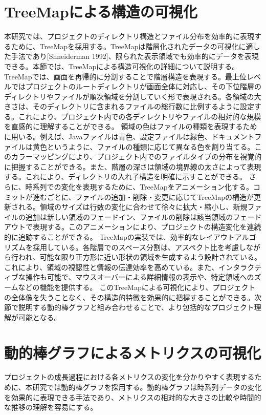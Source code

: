 \documentclass[12pt,twoside]{jbook}
\begin{document}
\section{TreeMapによる構造の可視化}
本研究では、プロジェクトのディレクトリ構造とファイル分布を効率的に表現するために、TreeMapを採用する。TreeMapは階層化されたデータの可視化に適した手法であり[Shneiderman 1992]、限られた表示領域でも効率的にデータを表現できる。本節では、TreeMapによる構造可視化の詳細について説明する。
TreeMapでは、画面を再帰的に分割することで階層構造を表現する。最上位レベルではプロジェクトのルートディレクトリが画面全体に対応し、その下位階層のディレクトリやファイルが順次領域を分割していく形で表現される。各領域の大きさは、そのディレクトリに含まれるファイルの総行数に比例するように設定する。これにより、プロジェクト内での各ディレクトリやファイルの相対的な規模を直感的に理解することができる。
領域の色はファイルの種類を表現するために用いる。例えば、Javaファイルは青色、設定ファイルは緑色、ドキュメントファイルは黄色というように、ファイルの種類に応じて異なる色を割り当てる。このカラーマッピングにより、プロジェクト内でのファイルタイプの分布を視覚的に把握することができる。また、階層の深さは領域の境界線の太さによって表現する。これにより、ディレクトリの入れ子構造を明確に示すことができる。
さらに、時系列での変化を表現するために、TreeMapをアニメーション化する。コミットが進むごとに、ファイルの追加・削除・変更に応じてTreeMapの構造が更新される。領域のサイズは行数の変化に合わせて徐々に拡大・縮小し、新規ファイルの追加は新しい領域のフェードイン、ファイルの削除は該当領域のフェードアウトで表現する。このアニメーションにより、プロジェクトの構造変化を連続的に追跡することができる。
TreeMapの実装では、効率的なレイアウトアルゴリズムを採用している。各階層でのスペース分割は、アスペクト比を考慮しながら行われ、可能な限り正方形に近い形状の領域を生成するよう設計されている。これにより、領域の視認性と情報の伝達効率を高めている。また、インタラクティブな操作も可能で、マウスオーバーによる詳細情報の表示や、特定領域へのズームなどの機能を提供する。
このTreeMapによる可視化により、プロジェクトの全体像を失うことなく、その構造的特徴を効果的に把握することができる。次節で説明する動的棒グラフと組み合わせることで、より包括的なプロジェクト理解が可能となる。

\section{動的棒グラフによるメトリクスの可視化}
プロジェクトの成長過程における各メトリクスの変化を分かりやすく表現するために、本研究では動的棒グラフを採用する。動的棒グラフは時系列データの変化を効果的に表現できる手法であり、メトリクスの相対的な大きさの比較や時間的な推移の理解を容易にする。
\end{document}
